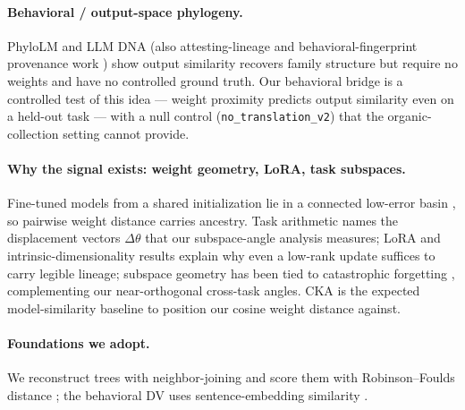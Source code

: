 \documentclass{article}
\begin{document}
\paragraph{Behavioral / output-space phylogeny.} PhyloLM \citep{yax2025phylolm} and LLM DNA
\citep{wu2026llmdna} (also attesting-lineage and behavioral-fingerprint provenance work
\citep{shang2026attesting, behavioral2026provenance}) show output similarity recovers family
structure but require no weights and have no controlled ground truth. Our behavioral bridge is a
controlled test of this idea --- weight proximity predicts output similarity even on a held-out task
--- with a null control (\texttt{no\_translation\_v2}) that the organic-collection setting cannot
provide.

\paragraph{Why the signal exists: weight geometry, LoRA, task subspaces.} Fine-tuned models from a
shared initialization lie in a connected low-error basin \citep{wortsman2022model, frankle2020linear},
so pairwise weight distance carries ancestry. Task arithmetic \citep{ilharco2023editing} names the
displacement vectors $\Delta\theta$ that our subspace-angle analysis measures; LoRA \citep{hu2022lora}
and intrinsic-dimensionality results \citep{aghajanyan2021intrinsic} explain why even a low-rank update
suffices to carry legible lineage; subspace geometry has been tied
to catastrophic forgetting \citep{kirkpatrick2017overcoming, steele2026subspace},
complementing our near-orthogonal cross-task angles. CKA \citep{kornblith2019similarity} is the
expected model-similarity baseline to position our cosine weight distance against.

\paragraph{Foundations we adopt.} We reconstruct trees with neighbor-joining
\citep{saitou1987neighbor} and score them with Robinson--Foulds distance \citep{robinson1981comparison};
the behavioral DV uses sentence-embedding similarity \citep{reimers2019sentence}.

\end{document}
